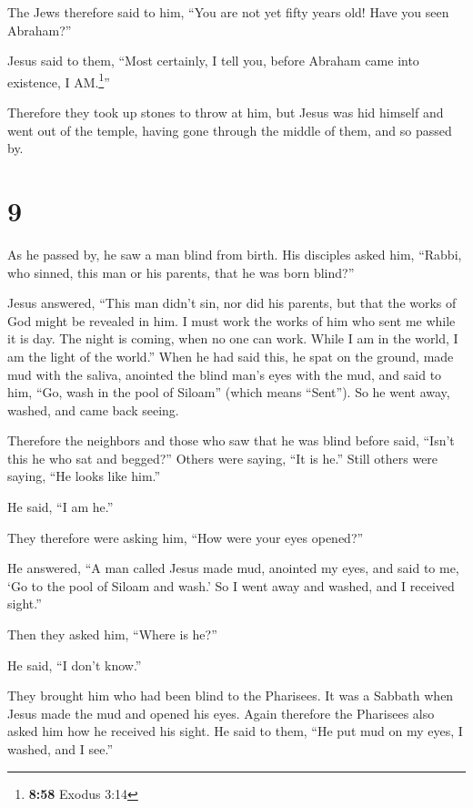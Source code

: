  The Jews therefore said to him, ``You are not yet fifty
years old! Have you seen Abraham?''

 Jesus said to them, ``Most certainly, I tell you, before
Abraham came into existence, I AM.\footnote{\textbf{8:58} Exodus 3:14}''

 Therefore they took up stones to throw at him, but Jesus
was hid himself and went out of the temple, having gone through the
middle of them, and so passed by.

\hypertarget{section-8}{%
\section{9}\label{section-8}}

 As he passed by, he saw a man blind from birth.
 His disciples asked him, ``Rabbi, who sinned, this man or
his parents, that he was born blind?''

 Jesus answered, ``This man didn't sin, nor did his
parents, but that the works of God might be revealed in him.
 I must work the works of him who sent me while it is day.
The night is coming, when no one can work.  While I am in
the world, I am the light of the world.''  When he had
said this, he spat on the ground, made mud with the saliva, anointed the
blind man's eyes with the mud,  and said to him, ``Go,
wash in the pool of Siloam'' (which means ``Sent''). So he went away,
washed, and came back seeing.

 Therefore the neighbors and those who saw that he was
blind before said, ``Isn't this he who sat and begged?'' 
Others were saying, ``It is he.'' Still others were saying, ``He looks
like him.''

He said, ``I am he.''

 They therefore were asking him, ``How were your eyes
opened?''

 He answered, ``A man called Jesus made mud, anointed my
eyes, and said to me, `Go to the pool of Siloam and wash.' So I went
away and washed, and I received sight.''

 Then they asked him, ``Where is he?''

He said, ``I don't know.''

 They brought him who had been blind to the Pharisees.
 It was a Sabbath when Jesus made the mud and opened his
eyes.  Again therefore the Pharisees also asked him how
he received his sight. He said to them, ``He put mud on my eyes, I
washed, and I see.''


